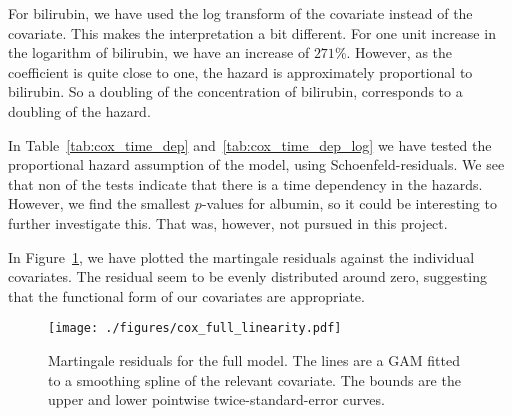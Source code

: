 \documentclass[11pt,a4paper]{article}
\begin{document}
For bilirubin, we have used the log transform of the covariate instead of the covariate.  This makes the interpretation a bit different. For one unit increase in the logarithm of bilirubin, we have an increase of $271\%$. 
However, as the coefficient is quite close to one, the hazard is approximately proportional to bilirubin. So a doubling of the concentration of bilirubin, corresponds to a doubling of the hazard.







In Table~\ref{tab:cox_time_dep} and~\ref{tab:cox_time_dep_log} we have tested the proportional hazard assumption of the model, using Schoenfeld-residuals. We see that non of the tests indicate that there is a time dependency in the hazards. However, we find the smallest $p$-values for albumin, so it could be interesting to further investigate this. That was, however, not pursued in this project.





In Figure~\ref{fig:cox_full_linearity}, we have plotted the martingale residuals against the individual covariates. The residual seem to be evenly distributed around zero, suggesting that the functional form of our covariates are appropriate.

\begin{figure}[h!tb]
    \begin{center}
        \texttt{[image: ./figures/cox\_full\_linearity.pdf]}
    \end{center}
    \vspace{-0.8cm}
    \caption{Martingale residuals for the full model. The lines are a GAM fitted to a smoothing spline of the relevant covariate. The bounds are the upper and lower pointwise twice-standard-error curves.}
    \label{fig:cox_full_linearity}
\end{figure}
\end{document}
